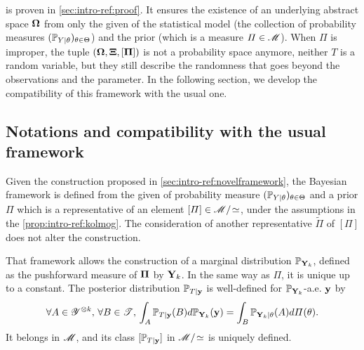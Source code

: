 
 is proven in \cref{sec:intro-ref:proof}. It ensures the existence of an underlying abstract space $\mathbf{\Omega}$
from only the given of the statistical model (the collection of probability measures $(\mathbb{P}_{Y|\theta})_{\theta\in\Theta}$) and the prior (which is a measure $\varPi\in\mathscr{M}$). When $\varPi$ is improper, the  tuple $(\mathbf{\Omega},\mathbf{\Xi},[\mathbf{\Pi}])$ is not a probability space anymore, neither $T$ is a random variable, but they still describe the randomness that goes beyond the observations and the parameter.
In the following section, we develop the compatibility of this framework with the usual one.











\subsection{Notations and compatibility with the usual framework}\label{sec:intro-ref:frameworkcompatibility}


Given the construction proposed in \cref{sec:intro-ref:novelframework}, the Bayesian framework is defined from the given of probability measure $(\mathbb{P}_{Y|\theta})_{\theta\in\Theta}$ and a prior $\varPi$ which is a representative of an element $[\varPi]\in\mathscr{M}/\!\simeq$, under the assumptions in the \cref{prop:intro-ref:kolmog}.
The consideration of another representative $\tilde\varPi$ of  $[\varPi]$ does not alter the construction.



That framework allows the construction of a marginal distribution $\mathbb{P}_{\mathbf{Y}_k}$, defined as the pushforward measure of $\mathbf{\Pi}$ by $\mathbf{Y}_k$.
In the same way as $\varPi$, it is unique up to a constant.
The posterior distribution $\mathbb{P}_{T|\mathbf{y}}$ is well-defined for $\mathbb{P}_{\mathbf{Y}_k}$-a.e. $\mathbf{y}$ by
\begin{equation}
    \forall A\in\mathscr{Y}^{\otimes k},\,\forall B\in\mathscr{T},\, \int_{A}\mathbb{P}_{T|\mathbf{y}}(B)d\mathbb{P}_{\mathbf{Y}_k}(\mathbf{y}) = \int_B \mathbb{P}_{\mathbf{Y}_k|\theta}(A)d\varPi(\theta).
\end{equation}
It belongs in $\mathscr{M}$, and its class $[\mathbb{P}_{T|\mathbf{y}}]$  in $\mathscr{M}/\!\simeq$ is uniquely defined.


